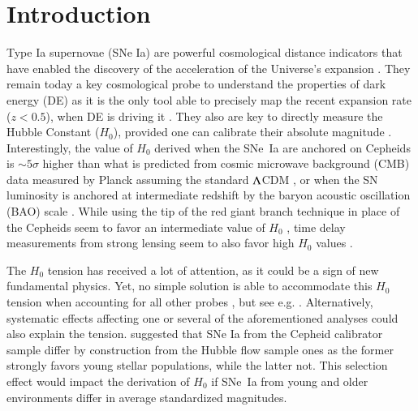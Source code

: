 \documentclass[]{aa}
\begin{document}
\maketitle

\section{Introduction}

Type Ia supernovae (SNe Ia) are powerful cosmological distance indicators that
have enabled the discovery of the acceleration of the Universe's expansion
\citep{riess1998, perlmutter1999}. They remain today a key cosmological probe to
understand the properties of dark energy (DE) as it is the only tool able to
precisely map the recent expansion rate ($z<0.5$), when DE is driving it
\citep[e.g.][]{scolnicastro2020}. They also are key to directly measure the
Hubble Constant ($H_0$), provided one can calibrate their absolute magnitude
\citep{riess2016, freedman2019}. Interestingly, the value of $H_0$ derived when
the SNe~Ia are anchored on Cepheids \citep[the SH0ES project,][]{riess2009,
riess2016} is $\sim5\sigma$ higher than what is predicted from cosmic microwave
background (CMB) data measured by Planck assuming the standard $\Lambda$CDM
\citep{planck2018, riess2019, reid2019}, or when the SN luminosity is anchored
at intermediate redshift by the baryon acoustic oscillation (BAO) scale
\citep{feeney2019}. While using the tip of the red giant branch technique in
place of the Cepheids seem to favor an intermediate value of $H_0$
\citep{freedman2019, freedman2020}, time delay measurements from strong lensing
seem to also favor high $H_0$ values \citep{wong2019}.

The $H_0$ tension has received a lot of attention, as it could be a sign of new
fundamental physics. Yet, no simple solution is able to accommodate this $H_0$
tension when accounting for all other probes \citep{knox2019}, but see e.g.
\cite{poulin2019}. Alternatively, systematic effects affecting one or several
of the aforementioned analyses could also explain the tension.
\cite{rigault2015} suggested that SNe Ia from the Cepheid calibrator sample
differ by construction from the Hubble flow sample ones as the former
strongly favors young stellar populations, while the latter not. This
selection effect would impact the derivation of $H_0$ if SNe~Ia from young and
older environments differ in average standardized magnitudes. 
\end{document}
